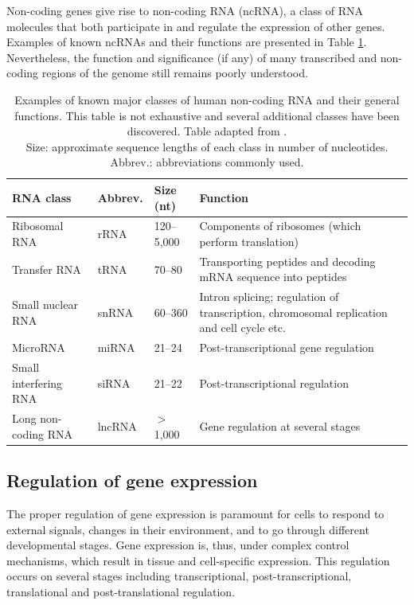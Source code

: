 Non-coding genes give rise to non-coding RNA (ncRNA), a class of RNA molecules
that both participate in and regulate the expression of other genes.
Examples of known ncRNAs and their functions are presented in Table
\ref{table:rnas}. Nevertheless, the function and significance (if any) of many
transcribed and non-coding regions of the genome still remains poorly understood.

\begin{table}
  \caption{Examples of known major classes of human non-coding RNA and their
  general functions. This table is not exhaustive and several additional classes have
  been discovered. Table adapted from \citep{Strachan2011}. \\
  Size: approximate sequence lengths of each class in number of nucleotides.
  Abbrev.: abbreviations commonly used.}
  \label{table:rnas}
  \centering
  {\fontsize{10pt}{12pt}\selectfont
  \begin{tabular}{ lllp{6cm} }
    \hline
    \textbf{RNA class} & \textbf{Abbrev.} & \textbf{Size (nt)} & \textbf{Function} \\
    \hline
    Ribosomal RNA         & rRNA   & 120--5,000  & Components of ribosomes (which perform translation) \\
    Transfer RNA          & tRNA   & 70--80     & Transporting peptides and decoding mRNA sequence into peptides \\
    Small nuclear RNA     & snRNA  & 60--360    & Intron splicing; regulation of transcription, chromosomal replication and cell cycle etc.  \\
    MicroRNA              & miRNA  & 21--24     & Post-transcriptional gene regulation \\
    Small interfering RNA & siRNA  & 21--22     & Post-transcriptional regulation \\
    Long non-coding RNA   & lncRNA & $>$ 1,000   & Gene regulation at several stages \\
    \hline
  \end{tabular}
  }
\end{table}




\subsection{Regulation of gene expression}\label{regulation-of-gene-expression}

The proper regulation of gene expression is paramount for cells to respond to
external signals, changes in their environment, and to go through different
developmental stages. Gene expression is, thus, under complex control mechanisms,
which result in tissue and cell-specific expression. This regulation
occurs on several stages including transcriptional, post-transcriptional,
translational and post-translational regulation. \citep{Strachan2011}

